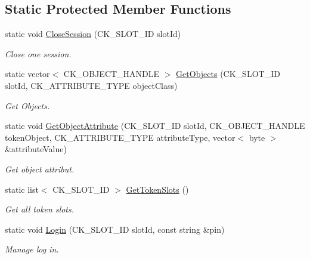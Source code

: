 \subsection*{Static Protected Member Functions}
\begin{DoxyCompactItemize}
\item 
static void \hyperlink{class_gost_crypt_1_1_security_token_a1fbc1972f699b9629d408ed5db81e6ee}{Close\+Session} (C\+K\+\_\+\+S\+L\+O\+T\+\_\+\+ID slot\+Id)
\begin{DoxyCompactList}\small\item\em Close one session. \end{DoxyCompactList}\item 
static vector$<$ C\+K\+\_\+\+O\+B\+J\+E\+C\+T\+\_\+\+H\+A\+N\+D\+LE $>$ \hyperlink{class_gost_crypt_1_1_security_token_ad14168a89d109f8dc364d4d23719d0d3}{Get\+Objects} (C\+K\+\_\+\+S\+L\+O\+T\+\_\+\+ID slot\+Id, C\+K\+\_\+\+A\+T\+T\+R\+I\+B\+U\+T\+E\+\_\+\+T\+Y\+PE object\+Class)
\begin{DoxyCompactList}\small\item\em Get Objects. \end{DoxyCompactList}\item 
static void \hyperlink{class_gost_crypt_1_1_security_token_af60684ab25839dacd13821d878c82e14}{Get\+Object\+Attribute} (C\+K\+\_\+\+S\+L\+O\+T\+\_\+\+ID slot\+Id, C\+K\+\_\+\+O\+B\+J\+E\+C\+T\+\_\+\+H\+A\+N\+D\+LE token\+Object, C\+K\+\_\+\+A\+T\+T\+R\+I\+B\+U\+T\+E\+\_\+\+T\+Y\+PE attribute\+Type, vector$<$ byte $>$ \&attribute\+Value)
\begin{DoxyCompactList}\small\item\em Get object attribut. \end{DoxyCompactList}\item 
static list$<$ C\+K\+\_\+\+S\+L\+O\+T\+\_\+\+ID $>$ \hyperlink{class_gost_crypt_1_1_security_token_a44e6be1a8c3ddad54acbe4a76488d0f7}{Get\+Token\+Slots} ()
\begin{DoxyCompactList}\small\item\em Get all token slots. \end{DoxyCompactList}\item 
static void \hyperlink{class_gost_crypt_1_1_security_token_a5c0504635e7fe36ef755c84f58744921}{Login} (C\+K\+\_\+\+S\+L\+O\+T\+\_\+\+ID slot\+Id, const string \&pin)
\begin{DoxyCompactList}\small\item\em Manage log in. \end{DoxyCompactList}\item 

\end{DoxyCompactItemize}
